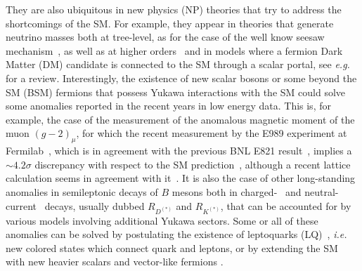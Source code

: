 \documentclass[a4paper,11pt]{article}
\begin{document}
They are also ubiquitous in new physics (NP) theories that try to address the shortcomings of the SM. For example, they appear in theories that generate neutrino masses both at tree-level, as for the case of the well know seesaw mechanism~\cite{Minkowski:1977sc,Mohapatra:1979ia,Yanagida:1979as,Gell-Mann:1979vob,Schechter:1980gr,Schechter:1981cv,
Lazarides:1980nt,Mohapatra:1980yp,
Foot:1988aq}, as well as at higher orders~\cite{Zee:1980ai,Zee:1985id,Babu:1988ki,FileviezPerez:2009ud} and in models where a fermion Dark Matter (DM) candidate is connected to the SM through a scalar portal, see {\emph{e.g.}}~\cite{Abercrombie:2015wmb} for a review. Interestingly, the existence of new scalar bosons  or some beyond the SM (BSM) fermions that possess Yukawa interactions with the SM could solve some anomalies reported in the recent years in low energy data.
This is, for example, the case of the measurement of the  anomalous magnetic moment of the muon $(g-2)_\mu$, for which the recent measurement by the E989 experiment at Fermilab~\cite{Muong-2:2021ojo}, which is in agreement with the previous BNL E821 result~\cite{Muong-2:2006rrc}, implies a $\sim 4.2\sigma$ discrepancy with respect to the SM prediction~\cite{Aoyama:2020ynm}, although a recent lattice calculation seems in agreement with it~\cite{Borsanyi:2020mff}.  It is also the case of other long-standing anomalies in semileptonic decays of $B$ mesons both in charged-~\cite{BaBar:2012obs,BaBar:2013mob,Belle:2015qfa,Belle:2016ure,Belle:2016dyj,LHCb:2015gmp,LHCb:2017smo,LHCb:2017rln,Belle:2019gij} and neutral-current~\cite{LHCb:2014vgu,LHCb:2017avl,LHCb:2021trn} decays, usually
dubbed $R_{D^{(*)}}$ and $R_{K^{(*)}}$,
that can be accounted for  by various models involving additional Yukawa sectors.
 Some or all of these anomalies can be solved by postulating the existence of leptoquarks (LQ)~\cite{Gripaios:2014tna,Becirevic:2015asa,Varzielas:2015iva,Alonso:2015sja,Calibbi:2015kma,Belanger:2015nma,Barbieri:2015yvd,Becirevic:2016oho,Becirevic:2016yqi,Sahoo:2016pet,Hiller:2016kry,Cox:2016epl,Crivellin:2017zlb,Cai:2017wry,Dorsner:2017ufx,Buttazzo:2017ixm,Assad:2017iib,DiLuzio:2017vat,Calibbi:2017qbu,Bordone:2017bld,Barbieri:2017tuq,Blanke:2018sro,Marzocca:2018wcf,Bordone:2018nbg,Becirevic:2018afm,Kumar:2018kmr,Crivellin:2018yvo,deMedeirosVarzielas:2018bcy,Azatov:2018kzb,DiLuzio:2018zxy,Faber:2018qon,Heeck:2018ntp,Angelescu:2018tyl,Arnan:2019olv,Gherardi:2019zil,Cornella:2019hct,Crivellin:2019dwb,Fuentes-Martin:2020bnh,Saad:2020ihm,Crivellin:2020ukd,Gherardi:2020qhc,Bordone:2020lnb,DaRold:2020bib,Angelescu:2021lln,Greljo:2021xmg,Marzocca:2021azj,Marzocca:2021miv,Greljo:2021npi}, {\emph{i.e.}} new colored  states which connect quark and leptons, or by extending the SM with new heavier scalars and vector-like fermions \cite{Gripaios:2015gra,Arnan:2016cpy,Kawamura:2017ecz,Cline:2017qqu,Barman:2018jhz,Grinstein:2018fgb,Li:2018rax,Li:2019xmi,Cerdeno:2019vpd,Arnan:2019uhr,Huang:2020ris,Arcadi:2021glq,Becker:2021sfd,Arcadi:2021cwg}.
\end{document}
